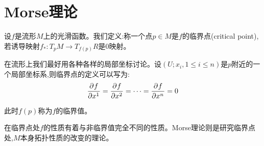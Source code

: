 \ifx\allfiles\undefined

	
	
\else
\fi
\part{Morse理论}
设$f$是流形$M$上的光滑函数。我们定义:称一个点$p\in M$是$f$的临界点(critical point),若诱导映射$f_*:T_pM \to T_{f(p)}R$是$0$映射。

在流形上我们最好用各种各样的局部坐标讨论。设$(U;x_i,1\leq i \leq n)$是$p$附近的一个局部坐标系,则临界点的定义可以写为:
\begin{align}
	\frac{\partial^{} f}{\partial {x^1}^{}}=\frac{\partial^{} f}{\partial {x^2}^{}}=\dots=\frac{\partial^{} f}{\partial {x^n}^{}}=0
\end{align}

此时$f(p)$称为$f$的临界值。

在临界点处$f$的性质有着与非临界值完全不同的性质。Morse理论则是研究临界点处,$M$本身拓扑性质的改变的理论。



\ifx\allfiles\undefined
	
	
	
	
	\else
	\fi